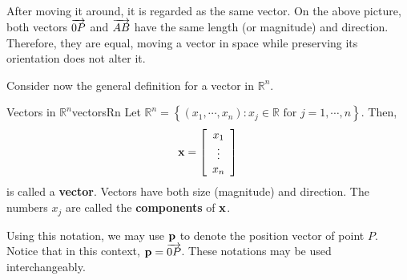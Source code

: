 \begin{center}
\end{center}

After moving it around, it is regarded as the same vector. On the above picture, both vectors $\overrightarrow{0P}$ and $\overrightarrow{AB}$ have the same length (or magnitude) and direction. Therefore, they are equal, moving a vector in space while preserving its orientation does not alter it.

Consider now the general definition for a vector in $\mathbb{R}^n$. 

\begin{definition}{Vectors in $\mathbb{R}^n$}{vectorsRn}
Let $\mathbb{R}^{n} = \left\{ \left( x_{1}, \cdots, x_{n}\right)
:x_{j}\in \mathbb{R}\text{ for }j=1,\cdots ,n\right\} .$
Then,
\begin{equation*}
{\bf x}
=
\left[ \begin{array}{c}
x_{1} \\
\vdots \\
x_{n}
\end{array}
\right] 
\end{equation*}
is called a \textbf{vector}. Vectors have both size (magnitude) and direction. 
The numbers $x_{j}$ are called the \textbf{components} of ${\bf x}$. 

\end{definition}

Using this notation, we may use ${\bf p}$ to denote the position vector of point $P$. Notice that in this context, ${\bf p} = \overrightarrow{0P}$. These notations may be used interchangeably. 


